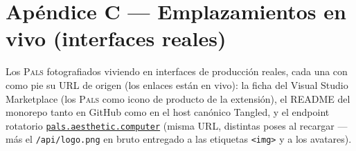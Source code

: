 \documentclass[10pt,letterpaper,twocolumn]{article}
\newcommand{\pals}{\textsc{Pals}}
\begin{document}
\section*{Apéndice C --- Emplazamientos en vivo (interfaces reales)}
\noindent Los \pals{} fotografiados viviendo en interfaces de producción
reales, cada una con como pie su URL de origen (los enlaces están en vivo): la
ficha del Visual Studio Marketplace (los \pals{} como icono de producto de la
extensión), el README del monorepo tanto en GitHub como en el host canónico
Tangled, y el endpoint rotatorio
\href{https://pals.aesthetic.computer}{\texttt{pals.aesthetic.computer}}
(misma URL, distintas poses al recargar --- más el
\texttt{/api/logo.png} en bruto entregado a las etiquetas \texttt{<img>} y a
los avatares).
\vspace{1.0em}


\end{document}

